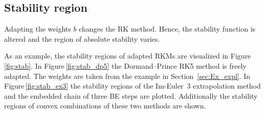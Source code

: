 \documentclass[a4paper]{article}
\numberwithin{equation}{section}
\theoremstyle{plain}
\theoremstyle{definition}
\numberwithin{theorem}{section}
\newcommand{\1}{\mathbbm{1}}
\begin{document}
\subsection{Stability region}

Adapting the weights $b$ changes the RK method. Hence, the stability
function is altered and the region of absolute stability varies.

As an example, the stability regions of adapted RKMs are visualized in
Figure\,\ref{fig:stab}.
In Figure\,\ref{fig:stab_dp5} the Dormand--Prince RK5 method is freely adapted.
The weights are taken from the example in Section~\ref{sec:Ex_expl}.
In Figure\,\ref{fig:stab_ex3} the stability regions of the Im-Euler~3
extrapolation method and the embedded chain of three BE steps are
plotted. Additionally the stability regions of convex combinations
of these two methods are shown.
\end{document}
